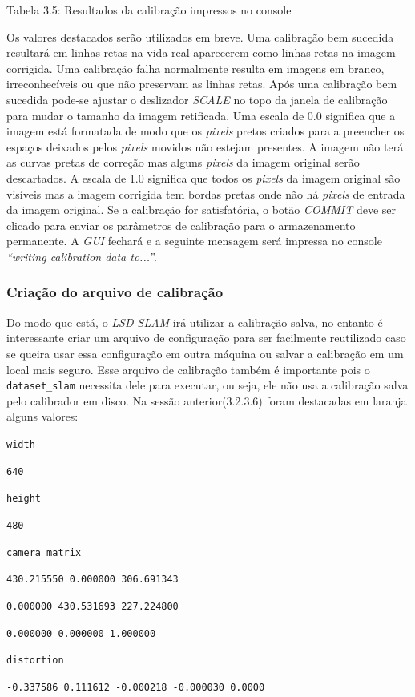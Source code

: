 Tabela 3.5: Resultados da calibração impressos no console
 
Os valores destacados serão utilizados em breve. Uma calibração bem sucedida resultará em linhas retas na vida real aparecerem como linhas retas na imagem corrigida. Uma calibração falha normalmente resulta em imagens em branco, irreconhecíveis ou que não preservam as linhas retas.
Após uma calibração bem sucedida pode-se ajustar o deslizador \textit{SCALE} no topo da janela de calibração para mudar o tamanho da imagem retificada. Uma escala de 0.0 significa que a imagem está formatada de modo que os \textit{pixels} pretos criados para a preencher os espaços deixados pelos \textit{pixels} movidos não estejam presentes. A imagem não terá as curvas pretas de correção mas alguns \textit{pixels} da imagem original serão descartados. A escala de 1.0 significa que todos os \textit{pixels} da imagem original são visíveis mas a imagem corrigida tem bordas pretas onde não há \textit{pixels} de entrada da imagem original.
Se a calibração for satisfatória, o botão \textit{COMMIT} deve ser clicado para enviar os parâmetros de calibração para o armazenamento permanente. A \textit{GUI} fechará e a seguinte mensagem será impressa no console \textit{“writing calibration data to...”}.

\subsubsection{Criação do arquivo de calibração}

Do modo que está, o \textit{LSD-SLAM} irá utilizar a calibração salva, no entanto é interessante criar um arquivo de configuração para ser facilmente reutilizado caso se queira usar essa configuração em outra máquina ou salvar a calibração em um local mais seguro. Esse arquivo de calibração também é importante pois o \texttt{dataset\_slam} necessita dele para executar, ou seja, ele não usa a calibração salva pelo calibrador em disco. Na sessão anterior(3.2.3.6) foram destacadas em laranja alguns valores:

{\setlength{\parindent}{0cm}
\texttt{width}

\texttt{640}


\texttt{height}

\texttt{480}


\texttt{camera matrix}

\texttt{430.215550 0.000000 306.691343}

\texttt{0.000000 430.531693 227.224800}

\texttt{0.000000 0.000000 1.000000}


\texttt{distortion}

\texttt{-0.337586 0.111612 -0.000218 -0.000030 0.0000}}



